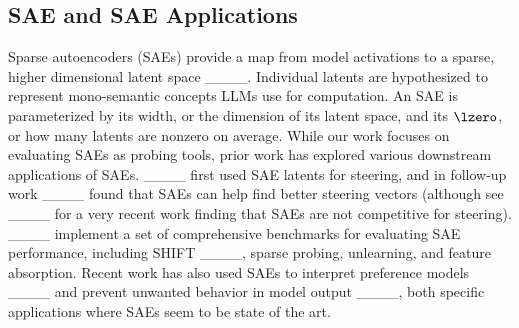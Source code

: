 \subsection{SAE and SAE Applications}
Sparse autoencoders (SAEs) provide a map from model activations to a sparse, higher dimensional latent space ____. Individual latents are hypothesized to represent mono-semantic concepts LLMs use for computation. An SAE is parameterized by its $\mathrm{width}$, or the dimension of its latent space, and its $\lzero$, or how many latents are nonzero on average. While our work focuses on evaluating SAEs as probing tools, prior work has explored various downstream applications of SAEs. ____ first used SAE latents for steering, and in follow-up work ____ found that SAEs can help find better steering vectors (although see ____ for a very recent work finding that SAEs are not competitive for steering). ____ implement a set of comprehensive benchmarks for evaluating SAE performance, including SHIFT ____, sparse probing, unlearning, and feature absorption. Recent work has also used SAEs to interpret preference models ____ and prevent unwanted behavior in model output ____, both specific applications where SAEs seem to be state of the art.